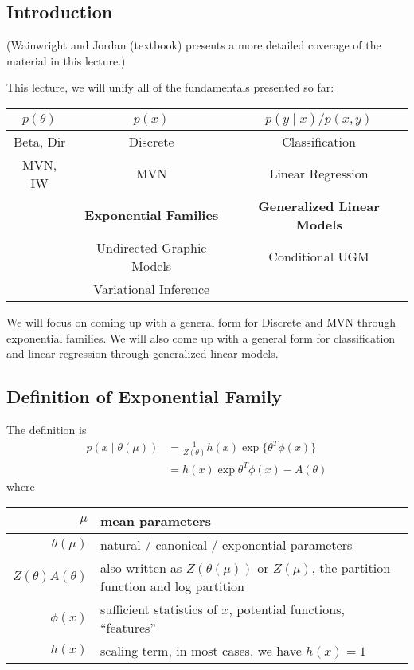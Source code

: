 \documentclass{article}
\begin{document}

\subsection{Introduction}
(Wainwright and Jordan (textbook) presents a more detailed coverage of the material in this lecture.)

\medskip

\noindent This lecture, we will unify all of the fundamentals presented so far:
\begin{center}
\begin{tabular}{c | c | c }
    $p(\theta)$ & $p(x)$ & $p(y \mid x) / p(x, y)$  \\ \hline
    Beta, Dir & Discrete & Classification \\ \hline
    MVN, IW & MVN & Linear Regression \\ \hline
    & \textbf{Exponential Families} & \textbf{Generalized Linear Models} \\ \hline
     &Undirected Graphic Models & Conditional UGM \\ \hline
    & Variational Inference %
\end{tabular}
\end{center}
We will focus on coming up with a general form for Discrete and MVN through exponential families. We will also come up with a general form for classification and linear regression through generalized linear models. 

\subsection{Definition of Exponential Family}
The definition is
\begin{align*}
p(x \mid \theta(\mu)) &= \frac{1}{Z(\theta)} h(x) \exp\{\theta^T \phi(x)\} \\
&= h(x) \exp{\theta^T \phi(x) - A(\theta)}
\end{align*}
where
\medskip

\begin{tabular}{r | l}
    $\mu$ & mean parameters \\ \hline
    $\theta(\mu)$ & natural / canonical / exponential parameters \\ \hline
    $Z(\theta)A(\theta)$ & also written as $Z(\theta(\mu))$ or $Z(\mu)$, the partition function and log partition \\ \hline
    $\phi(x)$ & sufficient statistics of $x$, potential functions, ``features'' \\ \hline
    $h(x)$ & scaling term, in most cases, we have $h(x) = 1$
\end{tabular}
\medskip
\end{document}
